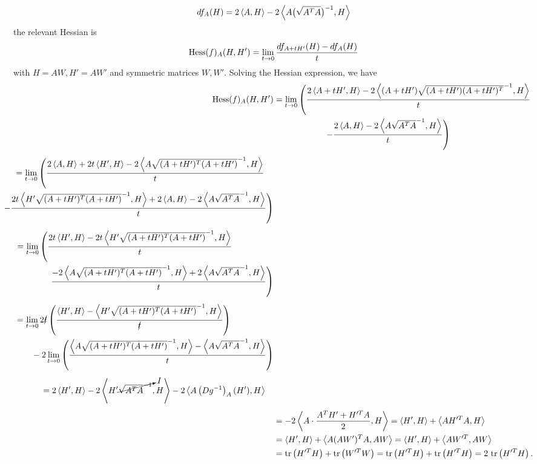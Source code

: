 \begin{displaymath}
	df_A(H) = 2\left\langle A,H\right\rangle-2\left\langle A\big(\sqrt{A^TA}\big)^{-1},H\right\rangle
\end{displaymath}
the relevant Hessian is 
\begin{equation*}
	\mathrm{Hess}(f)_A(H,H') = \lim_{t\to 0}\dfrac{df_{A+tH'}(H)-df_A(H)}{t} 
\end{equation*}
with $H=AW, H'=AW'$ and symmetric matrices $W,W'$. Solving the Hessian expression, we have
\begin{align*}
	\hess(f)_A(H,H') 
		& = \lim_{t\to 0} \left(\dfrac{2\innerprod{A+tH'}{H} - 2\innerprod{(A+tH')\sqrt{(A+tH')(A+tH')^T}^{-1}}{H}}{t}\right.
		\\
		& \qquad \qquad \qquad \left. -\dfrac{2\innerprod{A}{H}-2\innerprod{A\sqrt{A^TA}^{-1}}{H}}{t} \right)
	\\[1ex]
	\begin{split}
		& = \lim_{t\to 0} \left( \dfrac{2\innerprod{A}{H}+2t\innerprod{H'}{H}-2\innerprod{A\sqrt{(A+tH')^T(A+tH')}^{-1}}{H}}{t} \right. 
		\\
		& \kern -.5cm \left. -\dfrac{2t\innerprod{H'\sqrt{(A+tH')^T(A+tH')}^{-1}}{H} + 2\innerprod{A}{H}-2\innerprod{A\sqrt{A^TA}^{-1}}{H}}{t} \right)
	\end{split}
	\\[1ex]
	\begin{split}
		& = \lim_{t\to 0} \left( \dfrac{2t\innerprod{H'}{H}-2t\innerprod{H'\sqrt{(A+tH')^T(A+tH')}^{-1}}{H}}{t} \right. 
		\\ 
		& \qquad \qquad \left. \dfrac{-2\innerprod{A\sqrt{(A+tH')^T(A+tH')}^{-1}}{H}+2\innerprod{A\sqrt{A^TA}^{-1}}{H}}{t} \right)
	\end{split}
	\\[1ex]
	\begin{split}
		& = \lim_{t\to 0} 2\cancel{t}\paran{\dfrac{\innerprod{H'}{H}-\innerprod{H'\sqrt{(A+tH')^T(A+tH')}^{-1}}{H}}{\cancel{t}}}
		\\
		& \qquad  -2\lim_{t\to 0} \paran{\dfrac{\innerprod{A\sqrt{(A+tH')^T(A+tH')}^{-1}}{H}-\innerprod{A\sqrt{A^TA}^{-1}}{H}}{t}}
	\end{split}
	\\[1ex]
	\begin{split}
		& = 2\innerprod{H'}{H} - 2\innerprod{H'\cancelto{I}{\sqrt{A^TA}^{-1}}}{H} -2 \innerprod{A\paran{Dg^{-1}}_A(H')}{H}
	\end{split}
	\\[1ex]
	& = -2\innerprod{A\cdot \frac{A^TH'+H'^TA}{2}}{H} = \innerprod{H'}{H} + \innerprod{AH'^TA}{H} 
	\\
	& = \innerprod{H'}{H} + \innerprod{A(AW')^TA}{AW} =  \innerprod{H'}{H} + \innerprod{AW'^T}{AW}
	\\
	& = \trace{H'^TH} + \trace{W'^TW} = \trace{H'^TH} + \trace{H'^TH} = 2~\trace{H'^TH}.
\end{align*}

